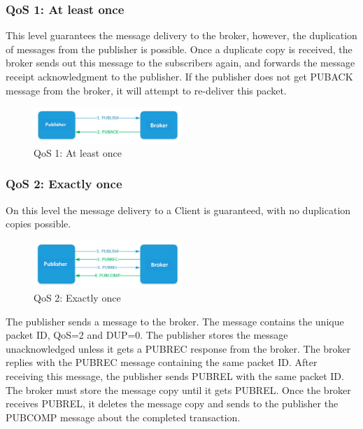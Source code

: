 \documentclass[\main/main.tex]{subfiles}
\begin{document}
\subsubsection{QoS 1: At least once}
This level guarantees the message delivery to the broker, however, the duplication of messages from the publisher is possible. Once a duplicate copy is received, the broker sends out this message to the subscribers again, and forwards the message receipt acknowledgment to the publisher. If the publisher does not get PUBACK message from the broker, it will attempt to re-deliver this packet.

\begin{figure}[H]
    \begin{center}
        \includegraphics[width=0.5\textwidth]{mqtt_qos_1.jpg}
    \end{center}
    \caption{QoS 1: At least once}
    \label{fig:mqtt_qos_1}
\end{figure}

\subsubsection{QoS 2: Exactly once}
On this level the message delivery to a Client is guaranteed, with no duplication copies possible.

\begin{figure}[H]
    \begin{center}
        \includegraphics[width=0.5\textwidth]{mqtt_qos_2.jpg}
    \end{center}
    \caption{QoS 2: Exactly once}
    \label{fig:mqtt_qos_2}
\end{figure}
The publisher sends a message to the broker. The message contains the unique packet ID, QoS=2 and DUP=0. The publisher stores the message unacknowledged unless it gets a PUBREC response from the broker. The broker replies with the PUBREC message containing the same packet ID. After receiving this message, the publisher sends PUBREL with the same packet ID. The broker must store the message copy until it gets PUBREL. Once the broker receives PUBREL, it deletes the message copy and sends to the publisher the PUBCOMP message about the completed transaction.
\end{document}
